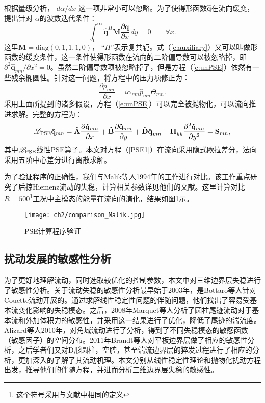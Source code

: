 根据量级分析\cite{Malik1999}， ${{d\alpha }}/{dx}$ 这一项非常小可以忽略。为了使得形函数$\mathbf{\hat q}$在流向缓变，提出针对 $\alpha$的波数迭代条件：
\begin{equation}
\label{e:auxiliary}
    \int_0^\infty  {{\mathbf{\hat q}}^H {\mathbf{M}}\frac{{\partial {\mathbf{\hat q}}}}{{\partial x}}\,dy}  = 0\qquad\forall x.
\end{equation}
这里$\mathbf{M}=\mathrm{diag}(0,1,1,1,0)$， ``$H$''表示复共轭。式（\ref{e:auxiliary}）又可以叫做形函数的缓变条件，这一条件使得形函数在流向的二阶偏导数可以被忽略掉，即${{\partial ^2 {\mathbf{\hat q}}_{mn} }}/{{\partial x^2 }}=0$\cite{Malik1994}。虽然二阶偏导数项被忽略掉了，但是方程（\ref{e:unPSE}）依然有一些残余椭圆性\cite{LiMalik1996}。针对这一问题，将方程中的压力项修正为：
\begin{equation}
    \frac{\partial \tilde p_{mn}}{\partial x} = i\alpha_{mn}\hat p_{mn}\Theta_{mn}.
\end{equation}
采用上面所提到的诸多假设，方程（\ref{e:unPSE}）可以完全被抛物化，可以流向推进求解。完整的方程为：
\begin{equation}
\label{PSE1}
    \mathscr{L}_{\rm PSE}{\mathbf{\hat q}}_{mn}  = {\mathbf{\hat A}}\frac{{\partial {\mathbf{\hat q}}_{mn} }}
    {{\partial x}} + {\mathbf{\hat B}}\frac{{\partial {\mathbf{\hat q}}_{mn} }}
    {{\partial y}} + {\mathbf{\hat D\hat q}}_{mn}  - {\mathbf{H}}_{yy} \frac{{\partial ^2 {\mathbf{\hat q}}_{mn} }}
    {{\partial y^2 }} = {\mathbf{S}}_{mn},
\end{equation}
其中$\mathscr{L}_{\rm PSE}$线性PSE算子。本文对方程（\ref{PSE1}）在流向采用隐式欧拉差分，法向采用五阶中心差分进行离散求解。

为了验证程序的正确性，我们与Malik等人1994年的工作\cite{Malik1994}进行对比。该工作重点研究了后掠Hiemenz流动的失稳，计算相关参数详见他们的文献。这里计算对比$\bar{R}=500$\footnote{这个符号采用与文献\cite{Malik1994}中相同的定义}工况中主模态的能量在流向的演化，结果如图\ref{f:com_malik}示。
\begin{figure}
  \centering
  \texttt{[image: ch2/comparison\_Malik.jpg]}
  \caption{PSE计算程序验证}\label{f:com_malik}
\end{figure}


\subsection{扰动发展的敏感性分析}
为了更好地理解流动，同时选取较优化的控制参数，本文中对三维边界层失稳进行了敏感性分析。关于流动失稳的敏感性分析最早始于2003年，是Bottaro\cite{Bottaro2003}等人针对Couette流动开展的。通过求解线性稳定性问题的伴随问题，他们找出了容易受基本流变化影响的失稳模态。之后，2008年Marquet等人\cite{Marquet2008}分析了圆柱尾迹流动对于基本流和外加体积力的敏感性，并采用这一结果进行了优化，降低了尾迹的湍流度。Alizard等人\cite{Alizard2010}2010年，对角域流动进行了分析，得到了不同失稳模态的敏感函数（敏感因子）的空间分布。2011年Brandt等人\cite{Brandt2011}对平板边界层做了相应的敏感性分析，之后学者们又对D形圆柱\cite{Meliga2012}，空腔\cite{Bromwne2014}，甚至湍流边界层的猝发过程进行了相应的分析\cite{Alizard2015}，更加深入的了解了其流动机理。本文分别从线性稳定性理论和抛物化扰动方程出发，推导他们的伴随方程，并进而分析三维边界层失稳的敏感性。

